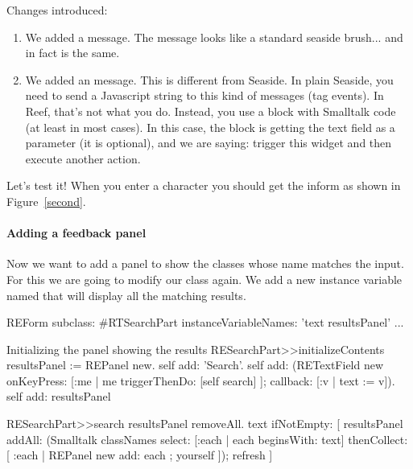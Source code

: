 \documentclass[a4paper,10pt,twoside]{book}
\begin{document}
Changes introduced: 
\begin{enumerate}
\item We added a  message. The  message looks like a standard seaside brush...
and in fact is the same.

\item We added an  message. This is different from Seaside. In plain Seaside,
you need to send a Javascript string to this kind of messages (tag events). 
In Reef, that's not what you do. Instead, you use a block with Smalltalk code (at least in most cases). 
In this case, the  block is getting the text field as a parameter (it is optional), and we are saying: trigger this widget and then execute another action.
\end{enumerate}
Let's test it! When you enter a character you should get the inform as shown in Figure~\ref{second}.

\paragraph{Adding a feedback panel}

Now we want to add a panel to show the classes whose name matches the input. 
For this we are going to modify our  class again. We add a new instance 
variable named  that will display all the matching results.

\begin{code}{}
REForm subclass: #RTSearchPart
	instanceVariableNames: 'text resultsPanel'
	...
\end{code}



\begin{code}{Initializing the panel showing the results}
RESearchPart>>initializeContents
	resultsPanel := REPanel new.
	self add: 'Search'.
	self add: (RETextField new
		onKeyPress: [:me | me triggerThenDo: [self search] ];
		callback: [:v | text := v]).
	self add: resultsPanel
\end{code}



\begin{code}{}
RESearchPart>>search
	resultsPanel removeAll.
	text ifNotEmpty: [ 
		resultsPanel
			addAll: (Smalltalk classNames
					select: [:each | each beginsWith: text]
					thenCollect: [ :each | 
							REPanel new 
								add: each ; yourself ]);
			refresh ]
\end{code}
\end{document}
